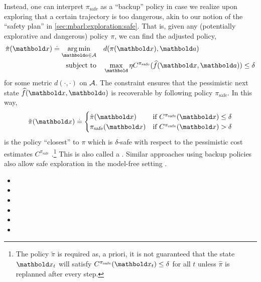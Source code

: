 Instead, one can interpret $\pi_{\mathrm{safe}}$ as a ``backup'' policy in case we realize upon exploring that a certain trajectory is too dangerous, akin to our notion of the ``safety plan'' in \cref{sec:mbarl:exploration:safe}.
That is, given any (potentially explorative and dangerous) policy $\pi$, we can find the adjusted policy, \begin{subequations}\begin{align}
  \hat{\pi}(\vx) \defeq \argmin_{\va \in \spA} \quad&d(\pi(\vx), \va) \\
  \text{subject to} \quad&\max_\veta C^{\pi_{\mathrm{safe}}}(\widehat{f}(\vx, \va)) \leq \delta
\end{align}\end{subequations} for some metric $d(\cdot, \cdot)$ on $\mathcal{A}$.
The constraint ensures that the pessimistic next state $\widehat{f}(\vx, \va)$ is recoverable by following policy $\pi_{\mathrm{safe}}$.
In this way, \begin{align}\begin{split}
  \tilde{\pi}(\vx) \defeq \begin{cases}
    \hat{\pi}(\vx) & \text{if $C^{\pi_{\mathrm{safe}}}(\vx) \leq \delta$} \\
    \pi_{\mathrm{safe}}(\vx) & \text{if $C^{\pi_{\mathrm{safe}}}(\vx) > \delta$} \\
  \end{cases}
\end{split}\end{align} is the policy ``closest'' to $\pi$ which is $\delta$-safe with respect to the pessimistic cost estimates $C^{\pi_{\mathrm{safe}}}$ \citep{curi2022safe}.\footnote{The policy $\tilde{\pi}$ is required as, a priori, it is not guaranteed that the state $\vx_t$ will satisfy $C^{\pi_{\mathrm{safe}}}(\vx_t) \leq \delta$ for all $t$ unless $\hat{\pi}$ is replanned after every step.}
This is also called a .
Similar approaches using backup policies also allow safe exploration in the model-free setting \citep{sukhija2022scalable,widmer2023tuning}.

\begin{oreadings}
  \begin{itemize}
    \item {}
    \item {}
    \item {}
    \item {}
    \item {}
    \item {}
  \end{itemize}
\end{oreadings}


